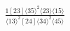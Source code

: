 \documentclass[varwidth, border=5pt]{standalone}
\begin{document}
\begin{my}
$\begin{gathered}
\scriptscriptstyle\frac{1[23]⟨35⟩^2⟨23⟩⟨15⟩}{⟨13⟩^2[24]⟨34⟩^2⟨45⟩}
\end{gathered}$
\end{my}
\end{document}
